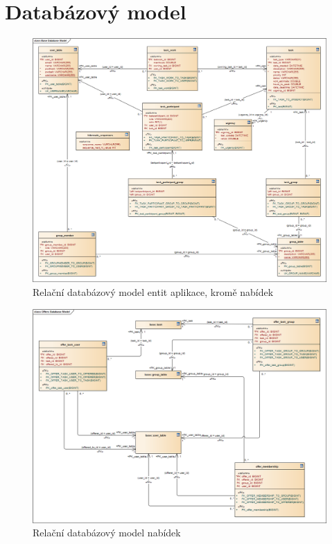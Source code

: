 \documentclass[thesis=B,czech]{FITthesis}[2012/06/26]
\begin{document}
\chapter{Databázový model}
\begin{figure}\centering
	\includegraphics[width=1\textwidth]{ea-diagrams/database/base.png}
	\caption[Databázový model]{Relační databázový model entit aplikace, kromě nabídek}
	\label{diagram:database-model-base}
\end{figure}

\begin{figure}\centering
	\includegraphics[width=1\textwidth]{ea-diagrams/database/offers.png}
	\caption[Databázový model nabídek]{Relační databázový model nabídek}
	\label{diagram:database-model-offers}
\end{figure}
\end{document}

